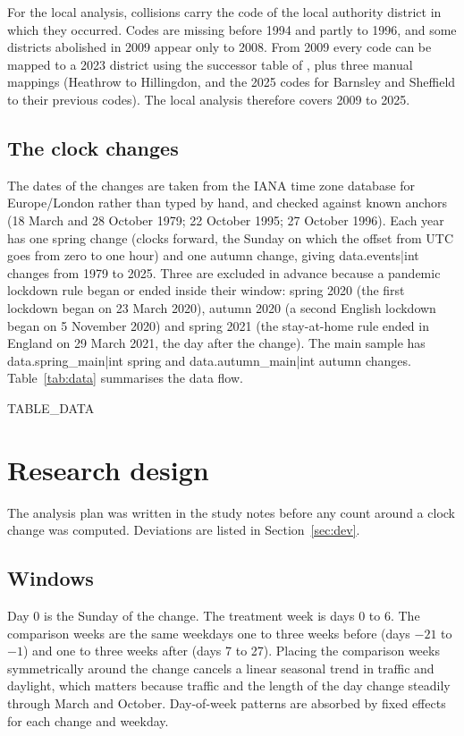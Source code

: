 \documentclass[11pt,a4paper]{article}
\begin{document}
For the local analysis, collisions carry the code of the local authority district in which they occurred. Codes are missing before 1994 and partly to 1996, and some districts abolished in 2009 appear only to 2008. From 2009 every code can be mapped to a 2023 district using the successor table of \citet{mysociety2026}, plus three manual mappings (Heathrow to Hillingdon, and the 2025 codes for Barnsley and Sheffield to their previous codes). The local analysis therefore covers 2009 to 2025.

\subsection{The clock changes}
The dates of the changes are taken from the IANA time zone database \citep{iana2026} for Europe/London rather than typed by hand, and checked against known anchors (18 March and 28 October 1979; 22 October 1995; 27 October 1996). Each year has one spring change (clocks forward, the Sunday on which the offset from UTC goes from zero to one hour) and one autumn change, giving {{data.events|int}} changes from 1979 to 2025. Three are excluded in advance because a pandemic lockdown rule began or ended inside their window: spring 2020 (the first lockdown began on 23 March 2020), autumn 2020 (a second English lockdown began on 5 November 2020) and spring 2021 (the stay-at-home rule ended in England on 29 March 2021, the day after the change). The main sample has {{data.spring_main|int}} spring and {{data.autumn_main|int}} autumn changes. Table~\ref{tab:data} summarises the data flow.

{{TABLE_DATA}}

\section{Research design}\label{sec:design}
The analysis plan was written in the study notes before any count around a clock change was computed. Deviations are listed in Section~\ref{sec:dev}.

\subsection{Windows}
Day 0 is the Sunday of the change. The treatment week is days 0 to 6. The comparison weeks are the same weekdays one to three weeks before (days $-21$ to $-1$) and one to three weeks after (days 7 to 27). Placing the comparison weeks symmetrically around the change cancels a linear seasonal trend in traffic and daylight, which matters because traffic and the length of the day change steadily through March and October. Day-of-week patterns are absorbed by fixed effects for each change and weekday.
\end{document}
